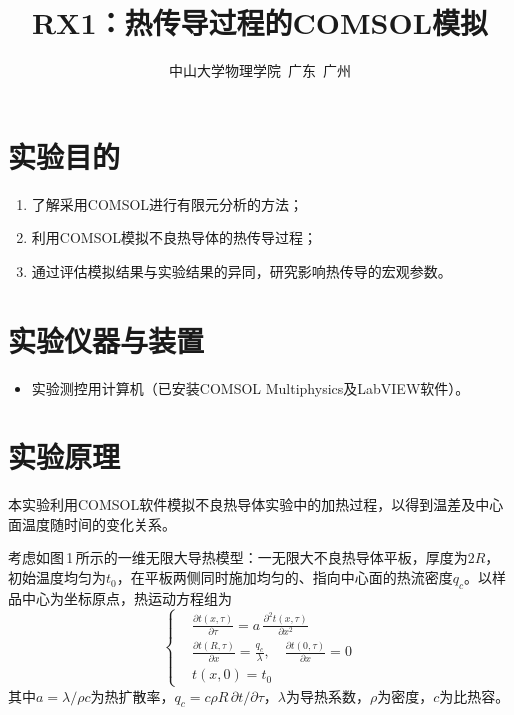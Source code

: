 \documentclass[a4paper,8pt,twocolumn]{article}
\title{
  \textbf{\huge RX1：热传导过程的COMSOL模拟}
}
\author{
  \small 中山大学物理学院~广东~广州
}
\begin{document}
\maketitle
\newpage

\section{实验目的}

\begin{enumerate}
  \item 了解采用COMSOL进行有限元分析的方法；
  \item 利用COMSOL模拟不良热导体的热传导过程；
  \item 通过评估模拟结果与实验结果的异同，研究影响热传导的宏观参数。
\end{enumerate}

\section{实验仪器与装置}

\begin{itemize}
  \item 实验测控用计算机（已安装COMSOL Multiphysics及LabVIEW软件）。
\end{itemize}

\section{实验原理}

本实验利用COMSOL软件模拟不良热导体实验中的加热过程，以得到温差及中心面温度随时间的变化关系。

考虑如图\,1\,所示的一维无限大导热模型：一无限大不良热导体平板，厚度为$2R$，初始温度均匀为$t_0$，在平板两侧同时施加均匀的、指向中心面的热流密度$q_c$。以样品中心为坐标原点，热运动方程组为
\begin{equation}
  \left\{
    \begin{aligned}
      &\frac{\partial t(x,\tau)}{\partial \tau}
        = a\,\frac{\partial^2 t(x,\tau)}{\partial x^2}\\[4pt]
      &\frac{\partial t(R,\tau)}{\partial x}=\frac{q_c}{\lambda},
        \quad\frac{\partial t(0,\tau)}{\partial x}=0\\[4pt]
      &t(x,0)=t_0
    \end{aligned}
  \right.
  \tag{RX1.1}
\end{equation}
其中$a=\lambda/\rho c$为热扩散率，$q_c=c\rho R\,\partial t/\partial\tau$，$\lambda$为导热系数，$\rho$为密度，$c$为比热容。
\end{document}
